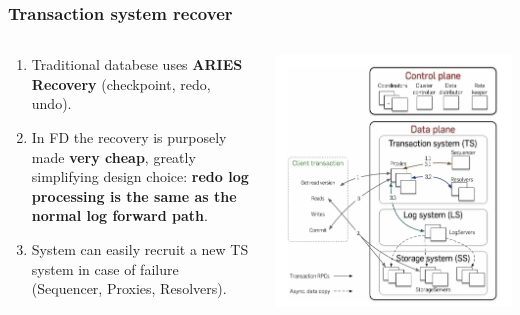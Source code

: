 \begin{frame}
    \frametitle{Transaction system recover}
    \begin{columns}
        \begin{column}{0.5\textwidth}
            \begin{enumerate}
                \item Traditional databese uses \textbf{ARIES Recovery} (checkpoint, redo, undo).
                \item In FD the recovery is purposely made \textbf{very cheap}, greatly simplifying design choice: \textbf{redo log processing is the same as the normal log forward path}.
                \item System can easily recruit a new TS system in case of failure (Sequencer, Proxies, Resolvers).
            \end{enumerate}
        \end{column}
        \begin{column}{0.5\textwidth}
            \centering
            \includegraphics[width=\textwidth]{img/2-Architecture/Architecture and transaction processing.png}
        \end{column}
    \end{columns}
\end{frame}

